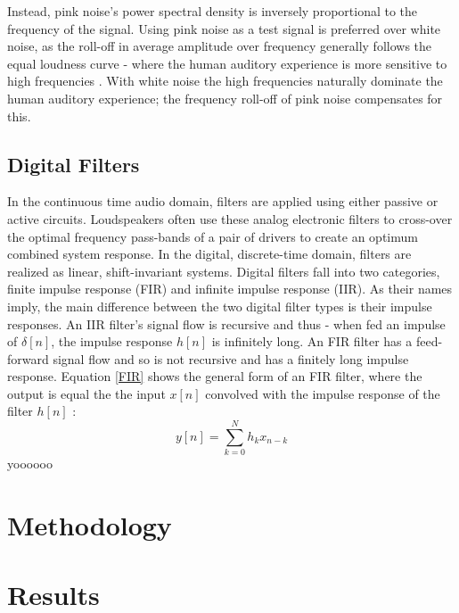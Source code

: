 \documentclass[conference]{IEEEtran}
\begin{document}
        Instead, pink noise's power spectral density is inversely proportional to the frequency of the signal.
        Using pink noise as a test signal is preferred over white noise, as the roll-off in average amplitude over frequency generally follows the equal loudness curve - where the human auditory experience is more sensitive to high frequencies \cite{GENELEC}.
        With white noise the high frequencies naturally dominate the human auditory experience; the frequency roll-off of pink noise compensates for this.
        
    \subsection{Digital Filters}
        In the continuous time audio domain, filters are applied using either passive or active circuits.
        Loudspeakers often use these analog electronic filters to cross-over the optimal frequency pass-bands of a pair of drivers to create an optimum combined system response.
        In the digital, discrete-time domain, filters are realized as linear, shift-invariant systems.
        Digital filters fall into two categories, finite impulse response (FIR) and infinite impulse response (IIR).
        As their names imply, the main difference between the two digital filter types is their impulse responses.
        An IIR filter's  signal flow is recursive and thus - when fed an impulse of $\delta[n]$, the impulse response $h[n]$ is infinitely long.
        An FIR filter has a feed-forward signal flow and so is not recursive and has a finitely long impulse response.
        Equation \ref{FIR} shows the general form of an FIR filter, where the output is equal the the input $x[n]$ convolved with the impulse response of the filter $h[n]$ \cite{JORDAN}:
        \begin{equation}\label{FIR}
            y[n] = \sum_{k=0}^N h_k x_{n-k}
        \end{equation}
        yoooooo
        
\section{Methodology}

\section{Results}



\end{document}
